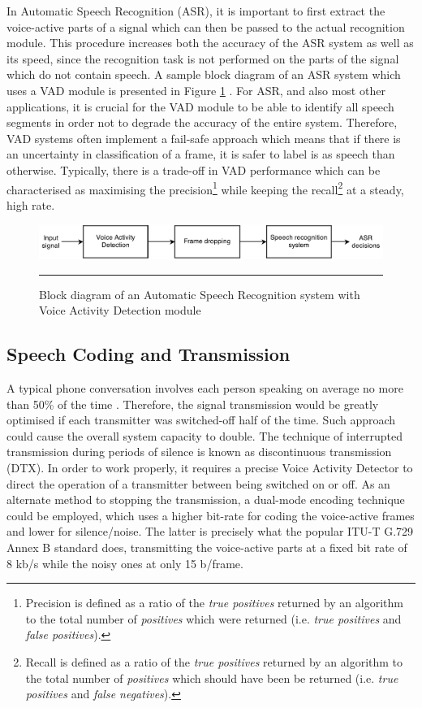 In Automatic Speech Recognition (ASR), it is important to first extract the voice-active parts of a signal which can then be passed to the actual recognition module. This procedure increases both the accuracy of the ASR system as well as its speed, since the recognition task is not performed on the parts of the signal which do not contain speech. A sample block diagram of an ASR system which uses a VAD module is presented in Figure \ref{fig:ASRVAD} \cite{RamirezGorriz}. For ASR, and also most other applications, it is crucial for the VAD module to be able to identify all speech segments in order not to degrade the accuracy of the entire system. Therefore, VAD systems often implement a fail-safe approach which means that if there is an uncertainty in classification of a frame, it is safer to label is as speech than otherwise. Typically, there is a trade-off in VAD performance which can be characterised as maximising the precision\footnote{Precision is defined as a ratio of the \emph{true positives} returned by an algorithm to the total number of \emph{positives} which were returned (i.e. \emph{true positives} and \emph{false positives}).} while keeping the recall\footnote{Recall is defined as a ratio of the \emph{true positives} returned by an algorithm to the total number of \emph{positives} which should have been be returned (i.e. \emph{true positives} and \emph{false negatives}).} at a steady, high rate. \bigskip

\begin{figure}[htbp]
	\centering
		\includegraphics[width=1\columnwidth]{Figures/Chapter1/ASRVAD.png}
		\rule{37em}{0.5pt}
	\caption[Automatic Speech Recognition system with Voice Activity Detection module]{Block diagram of an Automatic Speech Recognition system with Voice Activity Detection module \cite{RamirezGorriz}}
	\label{fig:ASRVAD}
\end{figure}

\subsection{Speech Coding and Transmission}

A typical phone conversation involves each person speaking on average no more than 50\% of the time \citep{GSMControl}. Therefore, the signal transmission would be greatly optimised if each transmitter was switched-off half of the time. Such approach could cause the overall system capacity to double. The technique of interrupted transmission during periods of silence is known as discontinuous transmission (DTX). In order to work properly, it requires a precise Voice Activity Detector to direct the operation of a transmitter between being switched on or off. As an alternate method to stopping the transmission, a dual-mode encoding technique could be employed, which uses a higher bit-rate for coding the voice-active frames and lower for silence/noise. The latter is precisely what the popular ITU-T G.729 Annex B \cite{G729} standard does, transmitting the voice-active parts at a fixed bit rate of 8 kb/s while the noisy ones at only 15 b/frame.

